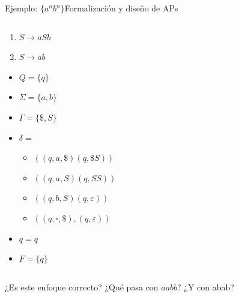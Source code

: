 \documentclass[spanish, handout]{beamer}
\begin{document}
\begin{frame}{Ejemplo: $\{a^nb^n\}$}{Formalización y diseño de APs}

    \begin{columns}
        \begin{column}{0.4\textwidth}
            \begin{enumerate}
                \item $S \to aSb$
                \item $S \to ab$
            \end{enumerate}

            \begin{itemize}
                \item $Q = \{q\}$
                \item $\Sigma = \{a, b\}$
                \item $\Gamma = \{\$, S\}$
                \item $\delta =$
                \begin{itemize}
                    \item $((q,a,\$)(q,\$S))$
                    \item $((q,a,S)(q,SS))$
                    \item $((q,b,S)(q,\varepsilon))$
                    \item $((q,\square,\$),(q,\varepsilon))$
                \end{itemize}
                \item $q = q$
                \item $F = \{q\}$
            \end{itemize}
        \end{column}
        \begin{column}{0.6\textwidth}
            \begin{center}
            \end{center}
        \end{column}
    \end{columns}
    
    \bigskip

    ¿Es este enfoque correcto? \pause
    ¿Qué pasa con $aabb$? \pause
    ¿Y con abab? 
\end{frame}
\end{document}
